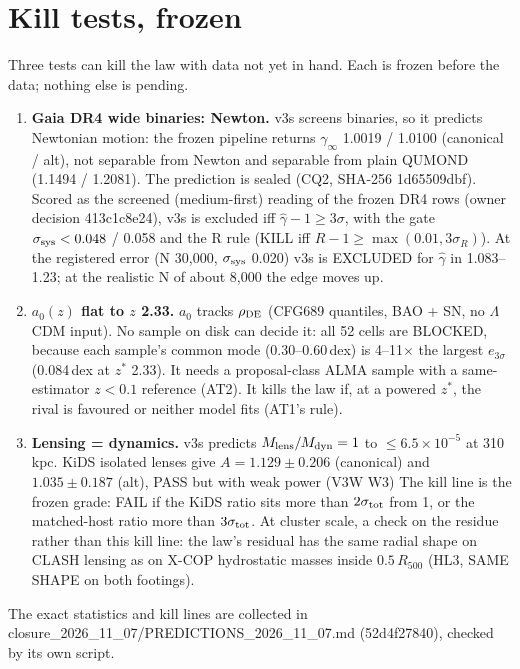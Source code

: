 \documentclass[10pt]{article}
\begin{document}
\section{Kill tests, frozen}
Three tests can kill the law with data not yet in hand. Each is frozen before the data; nothing else is pending.
\begin{enumerate}
\item \textbf{Gaia DR4 wide binaries: Newton.} v3s screens binaries, so it predicts Newtonian motion: the frozen pipeline returns $\gamma_\infty$ 1.0019 / 1.0100 (canonical / alt), not separable from Newton and separable from plain QUMOND (1.1494 / 1.2081). The prediction is sealed (CQ2, SHA-256 1d65509dbf). Scored as the screened (medium-first) reading of the frozen DR4 rows (owner decision 413c1c8e24), v3s is excluded iff $\hat\gamma-1\ge3\sigma$, with the gate $\sigma_{\rm sys}<0.048$ / 0.058 and the R rule (KILL iff $R-1\ge\max(0.01,3\sigma_R)$). At the registered error (N 30,000, $\sigma_{\rm sys}$ 0.020) v3s is EXCLUDED for $\hat\gamma$ in 1.083--1.23; at the realistic N of about 8,000 the edge moves up.
\item \textbf{$a_0(z)$ flat to $z$ 2.33.} $a_0$ tracks $\rho_{\rm DE}$ (CFG689 quantiles, BAO + SN, no $\Lambda$CDM input). No sample on disk can decide it: all 52 cells are BLOCKED, because each sample's common mode (0.30--0.60\,dex) is 4--11$\times$ the largest $e_{3\sigma}$ (0.084\,dex at $z^*$ 2.33). It needs a proposal-class ALMA sample with a same-estimator $z<0.1$ reference (AT2). It kills the law if, at a powered $z^*$, the rival is favoured or neither model fits (AT1's rule).
\item \textbf{Lensing = dynamics.} v3s predicts $M_{\rm lens}/M_{\rm dyn}=1$ to $\le6.5\times10^{-5}$ at 310\,kpc. KiDS isolated lenses give $A=1.129\pm0.206$ (canonical) and $1.035\pm0.187$ (alt), PASS but with weak power (V3W W3) The kill line is the frozen grade: FAIL if the KiDS ratio sits more than $2\sigma_{\rm tot}$ from 1, or the matched-host ratio more than $3\sigma_{\rm tot}$. At cluster scale, a check on the residue rather than this kill line: the law's residual has the same radial shape on CLASH lensing as on X-COP hydrostatic masses inside $0.5\,R_{500}$ (HL3, SAME SHAPE on both footings).
\end{enumerate}
The exact statistics and kill lines are collected in closure\_2026\_11\_07/PREDICTIONS\_2026\_11\_07.md (52d4f27840), checked by its own script.
\end{document}
